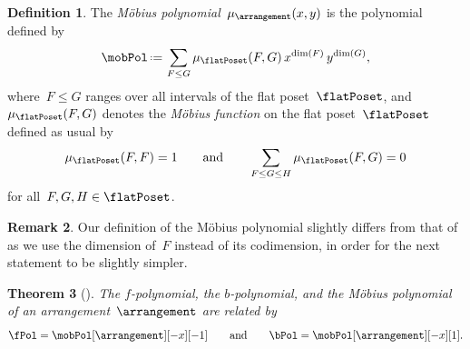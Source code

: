 \documentclass{amsart}
\newcommand{\darkblue}{\color{darkblue}} %
\newtheorem{theorem}{Theorem}[section]
\theoremstyle{definition}
\newtheorem{definition}[theorem]{Definition}
\newtheorem{remark}[theorem]{Remark}
\newcommand{\R}{\mathbb{R}} %
\newcommand{\eqdef}{\mbox{\,\raisebox{0.2ex}{\scriptsize\ensuremath{\mathrm:}}\ensuremath{=}\,}} %
\newcommand{\defn}[1]{\textsl{\darkblue #1}} %
\begin{document}
\begin{definition}
\label{def:MobiusPolynomial}
The \defn{M\"obius polynomial}~$\mu_{\arrangement}(x,y)$ is the polynomial defined by
\[
\mobPol \eqdef \sum_{F \le G} \mu_{\flatPoset}(F,G) \, x^{\dim(F)} \, y^{\dim(G)},
\]
where~$F \le G$ ranges over all intervals of the flat poset~$\flatPoset$, and~$\mu_{\flatPoset}(F,G)$ denotes the \defn{M\"obius function} on the flat poset~$\flatPoset$ defined as usual by
\[
\mu_{\flatPoset}(F, F) = 1
\qquad\text{and}\qquad
\sum_{F \le G \le H} \mu_{\flatPoset}(F,G) = 0
\]
for all~$F, G, H \in \flatPoset$.
\end{definition}

\begin{remark}
Our definition of the M\"obius polynomial slightly differs from that of \cite{Zaslavsky} as we use the dimension of~$F$ instead of its codimension, in order for the next statement to be slightly simpler.
\end{remark}

\begin{theorem}[{\cite[Thm.~A]{Zaslavsky}}]
\label{thm:Zaslavsky}
The $f$-polynomial, the $b$-polynomial, and the M\"obius polynomial of an arrangement~$\arrangement$ are related by
\[
\fPol = \mobPol[\arrangement][-x][-1]
\qquad\text{and}\qquad
\bPol = \mobPol[\arrangement][-x][1].
\]
\end{theorem}
\end{document}
